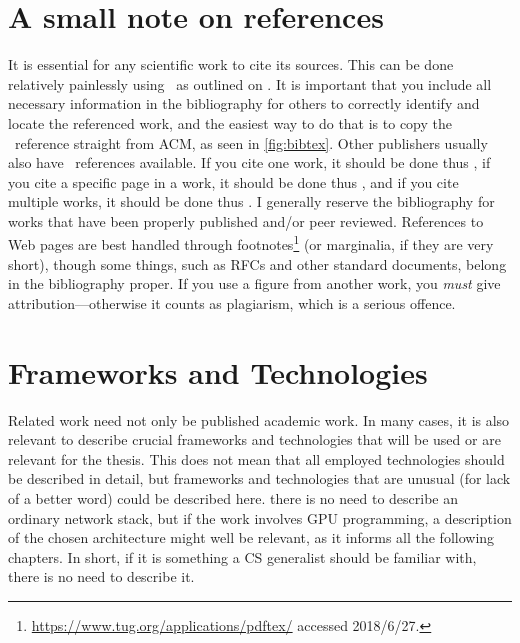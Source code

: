 \section{A small note on references}
\label{sec:small-note-refer}

It is essential for any scientific work to cite its sources. This can be
done relatively painlessly using \mBibTeX\ as outlined on
. It is important that you include all necessary
information in the bibliography for others to correctly identify and locate
the referenced work, and the easiest way to do that is to copy the \mBibTeX\
reference straight from ACM, as seen in \autoref{fig:bibtex}.  Other
publishers usually also have \mBibTeX\ references available. If you cite one
work, it should be done thus \cite{Kristensen2010:MP2P2010}, if you cite a
specific page in a work, it should be done thus
\cite[p. 410]{Chawathe2003:2003}, and if you cite multiple works, it should
be done thus
\cite{knuth:1976,knuth:1974,Kristensen2010:MP2P2010,Mittelbach2004:TLC2004}.
I generally reserve the bibliography for works that have been properly
published and/or peer reviewed. References to Web pages are best handled
through footnotes\footnote{\url{https://www.tug.org/applications/pdftex/}
  accessed 2018/6/27.} (or
marginalia, if they are very
short), though some things, such as RFCs and other standard documents,
belong in the bibliography proper. If you use a figure from another work,
you \emph{must} give attribution---otherwise it counts as plagiarism, which is
a serious offence.


\section{Frameworks and Technologies}
\label{sec:fram-techn}

Related work need not only be published academic work. In many cases, it is
also relevant to describe crucial frameworks and technologies that will be
used or are relevant for the thesis.  This does not mean that all employed
technologies should be described in detail, but frameworks and technologies
that are unusual (for lack of a better word) could be described here. \Eg
there is no need to describe an ordinary network stack, but if the work
involves GPU programming, a description of the chosen architecture might
well be relevant, as it informs all the following chapters.  In short, if it
is something a CS generalist should be familiar with, there is no need to
describe it.

